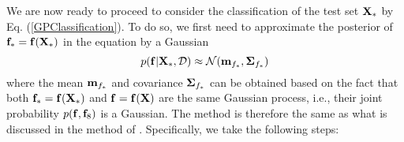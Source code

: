 \documentclass{article}
\begin{document}
We are now ready to proceed to consider the classification of the 
test set ${\bf X}_*$ by Eq. (\ref{GPClassification}). To do so, we 
first need to approximate the posterior of ${\bf f}_*={\bf f}({\bf X}_*)$ 
in the equation by a Gaussian
\begin{equation}
  p({\bf f}|{\bf X}_*,{\cal D})\approx
  {\cal N}({\bf m}_{f_*},{\bf\Sigma}_{f_*})
\end{equation}
where the mean ${\bf m}_{f_*}$ and covariance ${\bf\Sigma}_{f_*}$ can 
be obtained based on the fact that both ${\bf f}_*={\bf f}({\bf X}_*)$ 
and ${\bf f}={\bf f}({\bf X})$ are the same Gaussian process, i.e., 
their joint probability $p({\bf f},{\bf f}_8)$ is a Gaussian. The 
method is therefore the same as what is discussed in the method of 
. Specifically, we take 
the following steps:
\end{document}
